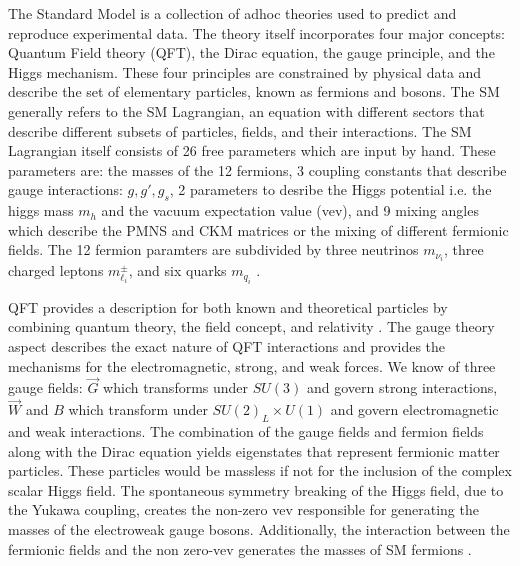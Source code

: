 The Standard Model is a collection of adhoc theories used to predict and reproduce experimental data. The theory itself incorporates four major concepts: Quantum Field theory (QFT), the Dirac equation, the gauge principle, and the Higgs mechanism. These four principles are constrained by physical data and describe the set of elementary particles, known as fermions and bosons. The SM generally refers to the SM Lagrangian, an equation with different sectors that describe different subsets of particles, fields, and their interactions. The SM Lagrangian itself consists of 26 free parameters which are input by hand. These parameters are: the masses of the 12 fermions, 3 coupling constants that describe gauge interactions: $g, g', g_s$, 2 parameters to desribe the Higgs potential i.e. the higgs mass $m_h$ and the vacuum expectation value (vev), and 9 mixing angles which describe the  PMNS and CKM matrices or the mixing of different fermionic fields. The 12 fermion paramters are subdivided by three neutrinos $m_{\nu_i}$, three charged leptons $m_{\ell_i}^\pm$, and six quarks $m_{q_i}$ \cite{Thomson:2013zua}.

QFT provides a description for both known and theoretical particles by combining quantum theory, the field concept, and relativity \cite{Peskin:1995ev}. The gauge theory aspect describes the exact nature of QFT interactions and provides the mechanisms for the electromagnetic, strong, and weak forces.  We know of three gauge fields:  $\vec{G}$ which transforms under $SU(3)$ and govern strong interactions, $\vec{W}$ and $B$ which transform under $SU(2)_L \times U(1)$ and govern electromagnetic and weak interactions. The combination of the gauge fields and fermion fields along with the Dirac equation yields eigenstates that represent fermionic matter particles. These particles would be massless if not for the inclusion of the complex scalar Higgs field.  The spontaneous symmetry breaking of the Higgs field, due to the Yukawa coupling, creates the non-zero vev responsible for generating the masses of the electroweak gauge bosons. Additionally, the interaction between the fermionic fields and the non zero-vev generates the masses of SM fermions \cite{Higgs:1966ev}\cite{Bernardi:2008zz}.

